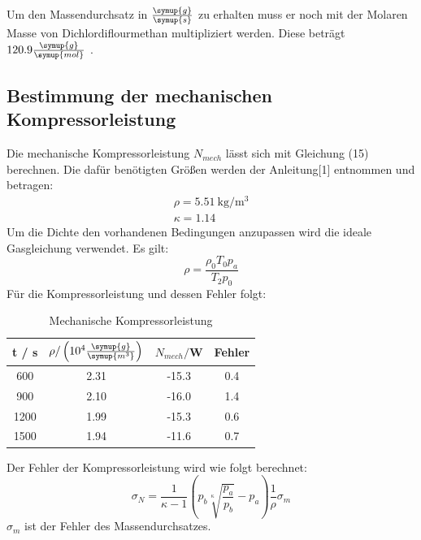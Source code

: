 Um den Massendurchsatz in $\frac{\symup{g}}{\symup{s}}$ zu erhalten muss er noch
mit der Molaren Masse von Dichlordiflourmethan multipliziert werden.
Diese beträgt $120.9\frac{\symup{g}}{\symup{mol}}$ \cite{sample4}.
\subsection{Bestimmung der mechanischen Kompressorleistung}
Die mechanische Kompressorleistung $N_{mech}$ lässt sich mit Gleichung (15) berechnen. Die dafür
benötigten Größen werden der Anleitung[1] entnommen und betragen:
\begin{align*}
  \rho = \SI{5.51}{\kilo\gram\per\cubic\meter} \\
  \kappa = 1.14
\end{align*}
Um die Dichte den vorhandenen Bedingungen anzupassen wird die ideale Gasgleichung
verwendet. Es gilt:
\begin{equation}
  \rho = \frac{\rho_0 T_0 p_a}{T_2 p_0}
\end{equation}
Für die Kompressorleistung und dessen Fehler folgt:
\begin{table}
  \centering
  \caption{Mechanische Kompressorleistung}
  \label{tab:Mechanische Kompressorleistung}
  \begin{tabular}{c c c c}
    \toprule
    t / s  &$\rho/\left(10^{4}\frac{\symup{g}}{\symup{m^3}}\right)$ & $N_{mech}/$W & Fehler \\
    \midrule
     600 & 2.31 & -15.3 & 0.4 \\
     900 & 2.10 & -16.0 & 1.4 \\
    1200 & 1.99 & -15.3 & 0.6 \\
    1500 & 1.94 & -11.6 & 0.7 \\
    \bottomrule
  \end{tabular}
\end{table}

Der Fehler der Kompressorleistung wird wie folgt berechnet:
\begin{equation}
  \sigma_N = \frac{1}{\kappa -1} \left(p_b \sqrt[\kappa]{\frac{p_a}{p_b}}-p_a\right)\frac{1}{\rho} \sigma_m
\end{equation}
$\sigma_m$ ist der Fehler des Massendurchsatzes.
